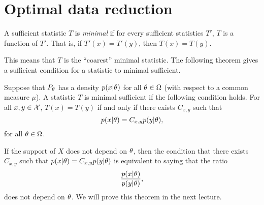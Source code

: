 \section{Optimal data reduction}
\begin{defn}
    A sufficient statistic $T$ is \emph{minimal} if for every sufficient statistics $T'$, $T$ is a function of $T'$. That is, if $T'(x) = T'(y)$, then $T(x)=T(y)$.
\end{defn}
This means that $T$ is the ``coarest'' minimal statistic. The following theorem gives a sufficient condition for a statistic to minimal sufficient.

\begin{thrm}
    Suppose that $P_{\theta}$ has a density $p(x|{\theta})$ for all ${\theta} \in {{\Omega}}$ (with respect to a common measure $\mu$). A statistic $T$ is minimal sufficient if the following condition holds. For all $x,y \in {\mathcal{X}}$, $T(x) = T(y)$ if and only if there exists $C_{x,y}$ such that 
    \[p(x|{\theta}) = C_{x,y}p(y|{\theta}), \]
    for all ${\theta} \in {{\Omega}}$.
\end{thrm}
If the support of $X$ does not depend on ${\theta}$, then the condition that there exists $C_{x,y}$ such that $p(x|{\theta}) = C_{x,y}p(y|{\theta})$ is equivalent to saying that the ratio 
\[\frac{p(x|{\theta})}{p(y|{\theta})}, \]
does not depend on ${\theta}$. We will prove this theorem in the next lecture.

